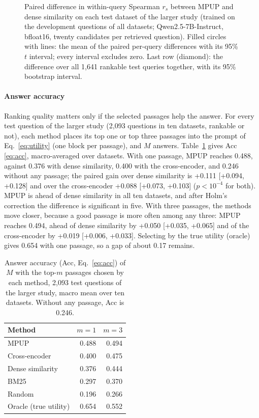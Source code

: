 \documentclass[preprint,12pt,authoryear]{elsarticle}
\begin{document}
\begin{figure}[htbp]
    \centering
    \resizebox{\columnwidth}{!}{}
    \caption{Paired difference in within-query Spearman $r_s$ between MPUP and dense similarity on each test dataset of the larger study (trained on the development questions of all datasets; Qwen2.5-7B-Instruct, bfloat16, twenty candidates per retrieved question). Filled circles with lines: the mean of the paired per-query differences with its 95\% $t$ interval; every interval excludes zero. Last row (diamond): the difference over all 1,641 rankable test queries together, with its 95\% bootstrap interval.}
    \label{fig:forest}
\end{figure}

\paragraph{Answer accuracy} Ranking quality matters only if the selected passages help the answer. For every test question of the larger study (2,093 questions in ten datasets, rankable or not), each method places its top one or top three passages into the prompt of Eq.~\eqref{eq:utility} (one block per passage), and $M$ answers. Table~\ref{tab:answer} gives Acc \eqref{eq:acc}, macro-averaged over datasets. With one passage, MPUP reaches 0.488, against 0.376 with dense similarity, 0.400 with the cross-encoder, and 0.246 without any passage; the paired gain over dense similarity is +0.111 [+0.094, +0.128] and over the cross-encoder +0.088 [+0.073, +0.103] ($p < 10^{-4}$ for both). MPUP is ahead of dense similarity in all ten datasets, and after Holm's correction the difference is significant in five. With three passages, the methods move closer, because a good passage is more often among any three: MPUP reaches 0.494, ahead of dense similarity by +0.050 [+0.035, +0.065] and of the cross-encoder by +0.019 [+0.006, +0.033]. Selecting by the true utility (oracle) gives 0.654 with one passage, so a gap of about 0.17 remains.

\begin{table}[htbp]
    \centering
    \caption{Answer accuracy (Acc, Eq.~\eqref{eq:acc}) of $M$ with the top-$m$ passages chosen by each method, 2,093 test questions of the larger study, macro mean over ten datasets. Without any passage, Acc is 0.246.}
    \label{tab:answer}
    \footnotesize
    \begin{tabular}{lrr}
        \toprule
        \textbf{Method} & \textbf{$m=1$} & \textbf{$m=3$} \\
        \midrule
        MPUP & 0.488 & 0.494 \\
        Cross-encoder & 0.400 & 0.475 \\
        Dense similarity & 0.376 & 0.444 \\
        BM25 & 0.297 & 0.370 \\
        Random & 0.196 & 0.266 \\
        \midrule
        Oracle (true utility) & 0.654 & 0.552 \\
        \bottomrule
    \end{tabular}
\end{table}
\end{document}
